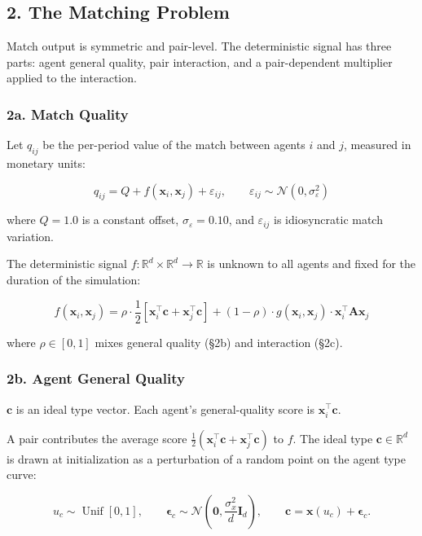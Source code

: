 \documentclass[11pt]{article}
\begin{document}
\subsection{2. The Matching Problem}\label{the-matching-problem}

Match output is symmetric and pair-level. The deterministic signal has three parts: agent general quality, pair interaction, and a pair-dependent multiplier applied to the interaction.

\subsubsection{2a. Match Quality}\label{a.-match-quality}

Let \(q_{ij}\) be the per-period value of the match between agents \(i\) and \(j\), measured in monetary units:

\[q_{ij} = Q + f(\mathbf{x}_i, \mathbf{x}_j) + \varepsilon_{ij}, \qquad
\varepsilon_{ij} \sim \mathcal{N}(0, \sigma_\varepsilon^2)\]

where \(Q = 1.0\) is a constant offset, \(\sigma_\varepsilon = 0.10\), and \(\varepsilon_{ij}\) is idiosyncratic match variation.

The deterministic signal \(f: \mathbb{R}^d \times \mathbb{R}^d \to \mathbb{R}\) is unknown to all agents and fixed for the duration of the simulation:

\[f(\mathbf{x}_i, \mathbf{x}_j) = \rho \cdot \frac{1}{2}\!\left[\mathbf{x}_i^\top \mathbf{c} + \mathbf{x}_j^\top \mathbf{c}\right] + (1 - \rho) \cdot g(\mathbf{x}_i, \mathbf{x}_j) \cdot \mathbf{x}_i^\top \mathbf{A} \mathbf{x}_j\]

where \(\rho \in [0,1]\) mixes general quality (§2b) and interaction (§2c).

\subsubsection{2b. Agent General Quality}\label{b.-agent-general-quality}

\(\mathbf{c}\) is an ideal type vector. Each agent's general-quality score is \(\mathbf{x}_i^\top\mathbf{c}\).

A pair contributes the average score \(\frac{1}{2}(\mathbf{x}_i^\top\mathbf{c}+\mathbf{x}_j^\top\mathbf{c})\) to \(f\). The ideal type \(\mathbf{c}\in\mathbb{R}^d\) is drawn at initialization as a perturbation of a random point on the agent type curve:

\[u_c\sim\operatorname{Unif}[0,1],\qquad
\boldsymbol{\epsilon}_c\sim\mathcal N\!\left(\mathbf 0,\frac{\sigma_x^2}{d}\mathbf I_d\right),\qquad
\mathbf c=\mathbf x(u_c)+\boldsymbol{\epsilon}_c.\]
\end{document}
